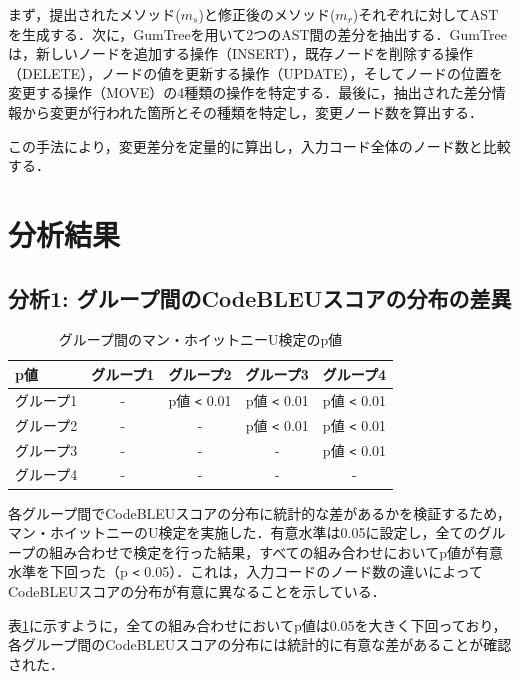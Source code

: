 \documentclass[11pt]{jreport}
\begin{document}
まず，提出されたメソッド($m_s$)と修正後のメソッド($m_r$)それぞれに対してASTを生成する．次に，GumTreeを用いて2つのAST間の差分を抽出する．GumTreeは，新しいノードを追加する操作（INSERT），既存ノードを削除する操作（DELETE），ノードの値を更新する操作（UPDATE），そしてノードの位置を変更する操作（MOVE）の4種類の操作を特定する．最後に，抽出された差分情報から変更が行われた箇所とその種類を特定し，変更ノード数を算出する．

この手法により，変更差分を定量的に算出し，入力コード全体のノード数と比較する．

\section{分析結果}



\subsection {分析1: グループ間のCodeBLEUスコアの分布の差異}

\begin{table}[h]
   \centering
   \caption{グループ間のマン・ホイットニーU検定のp値}
   \label{tab:mann-whitney}
   \begin{tabular}{l|cccc}
       \hline
       p値 & グループ1 & グループ2 & グループ3 & グループ4 \\
       \hline
       グループ1 & - & p値 \verb|<| 0.01 & p値 \verb|<| 0.01 & p値 \verb|<| 0.01 \\
       グループ2 & - & - & p値 \verb|<| 0.01 & p値 \verb|<| 0.01 \\
       グループ3 & - & - & - & p値 \verb|<| 0.01 \\
       グループ4 & - & - & - & - \\
       \hline
   \end{tabular}
\end{table}

各グループ間でCodeBLEUスコアの分布に統計的な差があるかを検証するため，マン・ホイットニーのU検定を実施した．有意水準は0.05に設定し，全てのグループの組み合わせで検定を行った結果，すべての組み合わせにおいてp値が有意水準を下回った（p \verb|<| 0.05）．これは，入力コードのノード数の違いによってCodeBLEUスコアの分布が有意に異なることを示している．

表\ref{tab:mann-whitney}に示すように，全ての組み合わせにおいてp値は0.05を大きく下回っており，各グループ間のCodeBLEUスコアの分布には統計的に有意な差があることが確認された．
\end{document}
